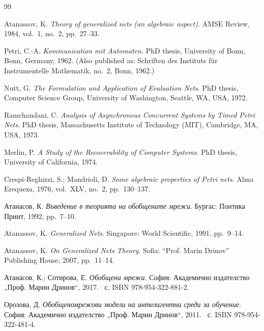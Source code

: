 \clearpage
{}
{}

\begin{thebibliography}{99}


Atanassov, K.
\newblock \emph{Theory of generalized nets (an algebraic aspect)}.
\newblock AMSE Review, 1984, vol.~1, no.~2, pp.~27--33.

Petri, C.-A.
\newblock \emph{Kommunication mit Automaten}.
\newblock PhD thesis, University of Bonn, Bonn, Germany, 1962.
\newblock (Also published as: Schriften des Instituts f{\"u}r Instrumentelle Mathematik, no.~2, Bonn, 1962.)

Nutt, G.
\newblock \emph{The Formulation and Application of Evaluation Nets}.
\newblock PhD thesis, Computer Science Group, University of Washington, Seattle, WA, USA, 1972.

Ramchandani, C.
\newblock \emph{Analysis of Asynchronous Concurrent Systems by Timed Petri Nets}.
\newblock PhD thesis, Massachusetts Institute of Technology (MIT), Cambridge, MA, USA, 1973.

Merlin, P.
\newblock \emph{A Study of the Recoverability of Computer Systems}.
\newblock PhD thesis, University of California, 1974.

Crespi-Reghizzi, S.; Mandrioli, D.
\newblock \emph{Some algebraic properties of Petri nets}.
\newblock Alma Erequeza, 1976, vol.~XLV, no.~2, pp.~130--137.

Атанасов, К.
\newblock \emph{Въведение в теорията на обобщените мрежи}.
\newblock Бургас: Понтика Принт, 1992, pp.~7--10.

Atanassov, K.
\newblock \emph{Generalized Nets}.
\newblock Singapore: World Scientific, 1991, pp.~9--14.

Atanassov, K.
\newblock \emph{On Generalized Nets Theory}.
\newblock Sofia: ``Prof. Marin Drinov'' Publishing House, 2007, pp.~11--14.


Атанасов, К.; Сотирова, Е.
\newblock \emph{Обобщени мрежи}.
\newblock \textnormal{София:} Академично издателство „Проф. Марин Дринов“, 2017.
~с.
\newblock ISBN 978-954-322-881-2.

Орозова, Д.
\newblock \emph{Обобщеномрежови модели на интелигентни среди за обучение}.
\newblock \textnormal{София:} Академично издателство „Проф. Марин Дринов“, 2011.
~с.
\newblock ISBN 978-954-322-481-4.


\end{thebibliography}
